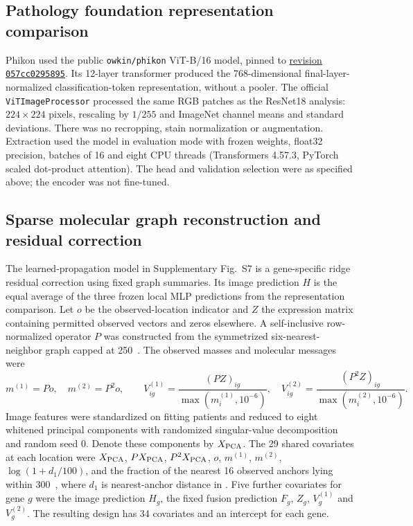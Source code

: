 \subsection{Pathology foundation representation comparison}
Phikon used the public \texttt{owkin/phikon} ViT-B/16 model, pinned to \href{https://huggingface.co/owkin/phikon/tree/057cc0295895c2df3dd7681a89680da6015cbefe}{revision \texttt{057cc0295895}}. Its 12-layer transformer produced the 768-dimensional final-layer-normalized classification-token representation, without a pooler. The official \texttt{ViTImageProcessor} processed the same RGB patches as the ResNet18 analysis: $224\times224$ pixels, rescaling by $1/255$ and ImageNet channel means and standard deviations. There was no recropping, stain normalization or augmentation. Extraction used the model in evaluation mode with frozen weights, float32 precision, batches of 16 and eight CPU threads (Transformers 4.57.3, PyTorch scaled dot-product attention). The head and validation selection were as specified above; the encoder was not fine-tuned.

\subsection{Sparse molecular graph reconstruction and residual correction}
The learned-propagation model in Supplementary Fig.~S7 is a gene-specific ridge residual correction using fixed graph summaries. Its image prediction $H$ is the equal average of the three frozen local MLP predictions from the representation comparison. Let $o$ be the observed-location indicator and $Z$ the expression matrix containing permitted observed vectors and zeros elsewhere. A self-inclusive row-normalized operator $P$ was constructed from the symmetrized six-nearest-neighbor graph capped at 250~\um{}. The observed masses and molecular messages were
\[
 m^{(1)}=Po,\quad m^{(2)}=P^2o,\qquad
 V^{(1)}_{ig}=\frac{(PZ)_{ig}}{\max(m^{(1)}_i,10^{-6})},\quad
 V^{(2)}_{ig}=\frac{(P^2Z)_{ig}}{\max(m^{(2)}_i,10^{-6})}.
\]
Image features were standardized on fitting patients and reduced to eight whitened principal components with randomized singular-value decomposition and random seed 0. Denote these components by $X_{\rm PCA}$. The 29 shared covariates at each location were $X_{\rm PCA}$, $PX_{\rm PCA}$, $P^2X_{\rm PCA}$, $o$, $m^{(1)}$, $m^{(2)}$, $\log(1+d_1/100)$, and the fraction of the nearest 16 observed anchors lying within 300~\um{}, where $d_1$ is nearest-anchor distance in \um{}. Five further covariates for gene $g$ were the image prediction $H_g$, the fixed fusion prediction $F_g$, $Z_g$, $V^{(1)}_g$ and $V^{(2)}_g$. The resulting design has 34 covariates and an intercept for each gene.

